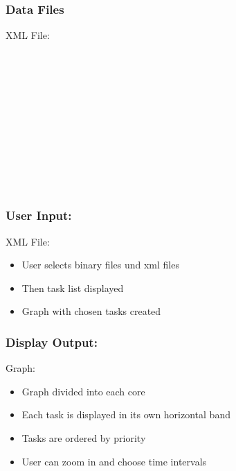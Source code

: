\documentclass{beamer}
\begin{document}
\begin{frame}
	\frametitle{Data Files}
	\begin{block}{XML File:}
			\\
			\\
			\\
			\\
			\\
			\\
			\\
			\\
			\\
			\\
			\\	
			\\			
	\end{block}
\end{frame}

\begin{frame}
	\frametitle{User Input:}
	\begin{block}{XML File:}
		\begin{itemize}
			\item User selects binary files und xml files
			\item Then task list displayed
			\item Graph with chosen tasks created
		\end{itemize}	
	\end{block}
\end{frame}

\begin{frame}
	\frametitle{Display Output:}
	\begin{block}{Graph:}
		\begin{itemize}
			\item Graph divided into each core
			\item Each task is displayed in its own horizontal band
			\item Tasks are ordered by priority
			\item User can zoom in and choose time intervals
		\end{itemize}	
	\end{block}
\end{frame}
\end{document}
